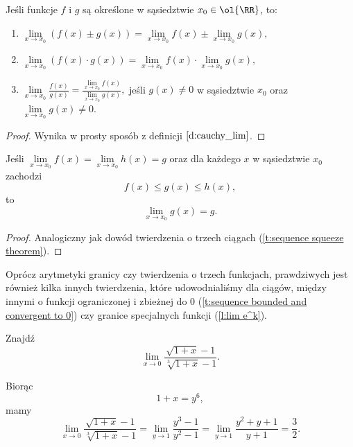 \begin{theorem}
    Jeśli funkcje $f$ i $g$ są określone w sąsiedztwie $x_0 \in \ol{\RR}$, to:
    \begin{enumerate}
        \item $\lim\limits_{x\to x_0} (f(x) \pm g(x)) = \lim\limits_{x\to x_0} f(x) \pm \lim\limits_{x\to x_0} g(x),$
        \item $\lim\limits_{x\to x_0} (f(x) \cdot g(x)) = \lim\limits_{x\to x_0} f(x) \cdot \lim\limits_{x\to x_0} g(x),$
        \item $\lim\limits_{x\to x_0} \frac{f(x)}{g(x)} = \frac{\lim\limits_{x\to x_0} f(x)}{\lim\limits_{x\to x_0} g(x)},$ jeśli $g(x) \neq 0$ w sąsiedztwie $x_0$ oraz $\lim\limits_{x\to x_0} g(x) \neq 0$.
    \end{enumerate}
\end{theorem}
\begin{proof}
    Wynika w prosty sposób z definicji $\ref{d:cauchy_lim}$.
\end{proof}

\begin{theorem}
    \label{t:squeeze theorem}
    Jeśli $\lim\limits_{x\to x_0} f(x) = \lim\limits_{x\to x_0} h(x) = g$ oraz dla każdego $x$ w sąsiedztwie $x_0$ zachodzi
    \[ f(x) \leq g(x) \leq h(x), \]
    to
    \[ \lim\limits_{x\to x_0} g(x) = g. \]
\end{theorem}
\begin{proof}
    Analogiczny jak dowód twierdzenia o trzech ciągach (\ref{t:sequence squeeze theorem}).
\end{proof}

\begin{remark}
    Oprócz arytmetyki granicy czy twierdzenia o trzech funkcjach, prawdziwych jest również kilka innych twierdzenia, które udowodnialiśmy dla ciągów, między innymi o funkcji ograniczonej i zbieżnej do $0$ (\ref{t:sequence bounded and convergent to 0}) czy granice specjalnych funkcji (\ref{l:lim e^k}).
\end{remark}

\begin{example}  %
    Znajdź
    \[ \lim_{x \to 0} \frac{\sqrt{1+ x} - 1}{\sqrt[3]{1 + x} - 1}. \]
\end{example}
\begin{solution}
    Biorąc
    \[ 1 + x = y^6, \]
    mamy
    \[ \lim_{x \to 0} \frac{\sqrt{1+ x} - 1}{\sqrt[3]{1 + x} - 1} = \lim_{y \to 1} \frac{y^3 - 1}{y^2 - 1} = \lim_{y \to 1} \frac{y^2 + y + 1}{y + 1} = \frac{3}{2}. \]
\end{solution}

